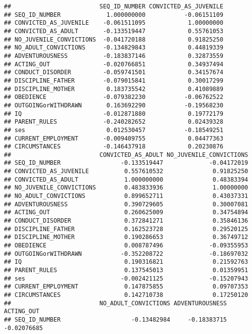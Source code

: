 \documentclass[]{article}
\begin{document}
\begin{verbatim}
##                         SEQ_ID_NUMBER CONVICTED_AS_JUVENILE
## SEQ_ID_NUMBER             1.000000000           -0.06151109
## CONVICTED_AS_JUVENILE    -0.061511095            1.00000000
## CONVICTED_AS_ADULT       -0.133519447            0.55761053
## NO_JUVENILE_CONVICTIONS  -0.041720188            0.91825250
## NO_ADULT_CONVICTIONS     -0.134829843            0.44819339
## ADVENTUROUSNESS          -0.183837146            0.32873559
## ACTING_OUT               -0.020766851            0.34937494
## CONDUCT_DISORDER         -0.059741501            0.34157674
## DISCIPLINE_FATHER        -0.079015841            0.30017299
## DISCIPLINE_MOTHER         0.183735542            0.41089889
## OBEDIENCE                -0.079382230           -0.06762522
## OUTGOINGorWITHDRAWN       0.163692290           -0.19568230
## IQ                       -0.012871880            0.19772179
## PARENT_RULES             -0.240282652            0.02439328
## ses                       0.012530457           -0.18549251
## CURRENT_EMPLOYMENT       -0.009409755            0.04477363
## CIRCUMSTANCES            -0.146437918            0.20230876
##                         CONVICTED_AS_ADULT NO_JUVENILE_CONVICTIONS
## SEQ_ID_NUMBER                 -0.133519447             -0.04172019
## CONVICTED_AS_JUVENILE          0.557610532              0.91825250
## CONVICTED_AS_ADULT             1.000000000              0.48383394
## NO_JUVENILE_CONVICTIONS        0.483833936              1.00000000
## NO_ADULT_CONVICTIONS           0.899652711              0.43037331
## ADVENTUROUSNESS                0.390729605              0.30007081
## ACTING_OUT                     0.260625009              0.34754894
## CONDUCT_DISORDER               0.372841271              0.35846136
## DISCIPLINE_FATHER              0.162523728              0.29520125
## DISCIPLINE_MOTHER              0.190286653              0.36749712
## OBEDIENCE                      0.008787496             -0.09355953
## OUTGOINGorWITHDRAWN           -0.352208722             -0.18697032
## IQ                             0.190316821              0.21592763
## PARENT_RULES                   0.137545013              0.01359951
## ses                           -0.002421125             -0.15207943
## CURRENT_EMPLOYMENT             0.147875855              0.09707353
## CIRCUMSTANCES                  0.142710738              0.17250120
##                         NO_ADULT_CONVICTIONS ADVENTUROUSNESS  ACTING_OUT
## SEQ_ID_NUMBER                    -0.13482984     -0.18383715 -0.02076685

\end{verbatim}
\end{document}

